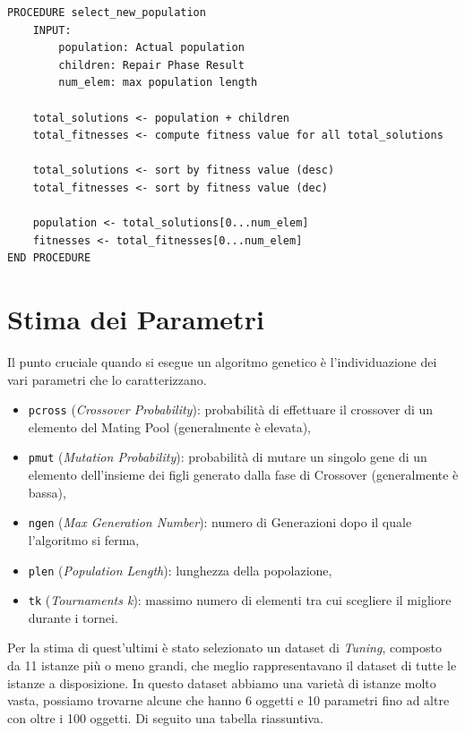 \begin{minipage}{\textwidth}
    \begin{lstlisting}
PROCEDURE select_new_population
    INPUT:
        population: Actual population
        children: Repair Phase Result
        num_elem: max population length

    total_solutions <- population + children
    total_fitnesses <- compute fitness value for all total_solutions

    total_solutions <- sort by fitness value (desc)
    total_fitnesses <- sort by fitness value (dec)

    population <- total_solutions[0...num_elem]
    fitnesses <- total_fitnesses[0...num_elem]
END PROCEDURE
\end{lstlisting}
\end{minipage}

\section{Stima dei Parametri}

Il punto cruciale quando si esegue un algoritmo genetico è l'individuazione dei
vari parametri che lo caratterizzano.

\begin{itemize}
    \item \verb|pcross| (\textit{Crossover Probability}): probabilità di
          effettuare il crossover di un elemento del Mating Pool (generalmente è
          elevata),
    \item \verb|pmut| (\textit{Mutation Probability}): probabilità di mutare un
          singolo gene di un elemento dell'insieme dei figli generato dalla fase
          di Crossover (generalmente è bassa),
    \item \verb|ngen| (\textit{Max Generation Number}): numero di Generazioni
          dopo il quale l'algoritmo si ferma,
    \item \verb|plen| (\textit{Population Length}): lunghezza della popolazione,
    \item \verb|tk| (\textit{Tournaments k}): massimo numero di elementi tra cui
          scegliere il migliore durante i tornei.
\end{itemize}

Per la stima di quest'ultimi è stato selezionato un dataset di \textit{Tuning},
composto da 11 istanze più o meno grandi, che meglio rappresentavano il dataset
di tutte le istanze a disposizione. In questo dataset abbiamo una varietà di
istanze molto vasta, possiamo trovarne alcune che hanno 6 oggetti e 10 parametri
fino ad altre con oltre i 100 oggetti. Di seguito una tabella riassuntiva.

